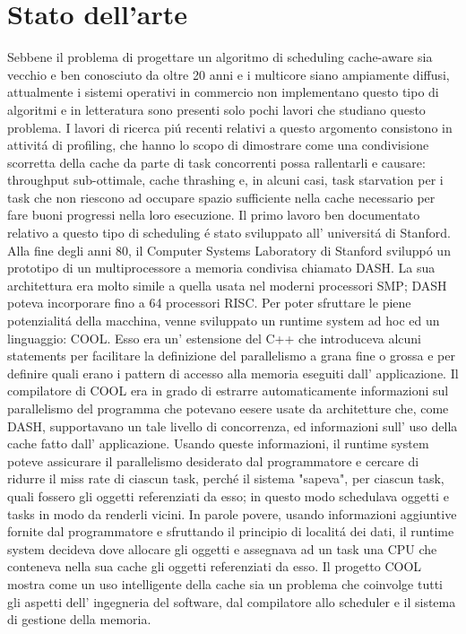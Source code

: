 \section{Stato dell'arte}
\label{sec:StateDellArte}

Sebbene il problema di progettare un algoritmo di scheduling cache-aware sia vecchio e ben conosciuto da oltre 20 anni e i multicore siano ampiamente 
diffusi, attualmente i sistemi operativi in commercio non implementano questo tipo di algoritmi e in letteratura sono presenti solo pochi lavori che 
studiano questo problema. I lavori di ricerca pi\'u recenti relativi a questo argomento consistono in attivit\'a di profiling, che hanno lo scopo di 
dimostrare come una condivisione scorretta della cache da parte di task concorrenti possa rallentarli e causare: throughput sub-ottimale, cache thrashing
e, in alcuni casi, task starvation per i task che non riescono ad occupare spazio sufficiente nella cache necessario per fare buoni progressi nella loro 
esecuzione. Il primo lavoro ben documentato relativo a questo tipo di scheduling \'e stato sviluppato all' universit\'a di Stanford. Alla fine degli anni 
80, il Computer Systems Laboratory di Stanford svilupp\'o un prototipo di un multiprocessore a memoria condivisa chiamato DASH. La sua architettura era 
molto simile a quella usata nel moderni processori SMP; DASH poteva incorporare fino a 64 processori RISC. Per poter sfruttare le piene potenzialit\'a della
macchina, venne sviluppato un runtime system ad hoc ed un linguaggio: COOL. Esso era un' estensione del C++ che introduceva alcuni statements per facilitare
la definizione del parallelismo a grana fine o grossa e per definire quali erano i pattern di accesso alla memoria eseguiti dall' applicazione. Il 
compilatore di COOL era in grado di estrarre automaticamente informazioni sul parallelismo del programma che potevano eesere usate da 
architetture che, come DASH, supportavano un tale livello di concorrenza, ed informazioni sull' uso della cache fatto dall' applicazione. Usando queste
informazioni, il runtime system poteve assicurare il parallelismo desiderato dal programmatore e cercare di ridurre il miss rate di ciascun task, perch\'e 
il sistema "sapeva", per ciascun task, quali fossero gli oggetti referenziati da esso; in questo modo schedulava oggetti e tasks in modo da renderli vicini.
In parole povere, usando informazioni aggiuntive fornite dal programmatore e sfruttando il principio di localit\'a dei dati, il runtime system decideva dove
allocare gli oggetti e assegnava ad un task una CPU che conteneva nella sua cache gli oggetti referenziati da esso. Il progetto COOL mostra come un uso 
intelligente della cache sia un problema che coinvolge tutti gli aspetti dell' ingegneria del software, dal compilatore allo scheduler e il sistema di 
gestione della memoria.


